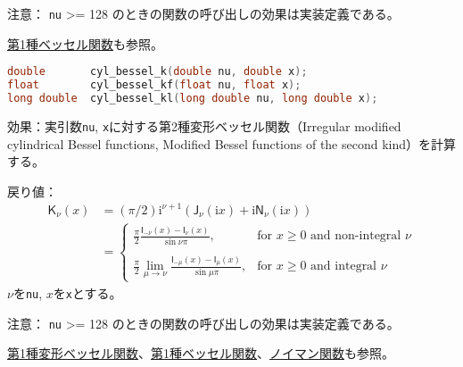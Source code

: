 \noindent
\textsf{注意}： \lstinline!nu! \textgreater{}= 128
のときの関数の呼び出しの効果は実装定義である。

\noindent
\hyperref[section8-16]{第1種ベッセル関数}も参照。

%

\bgroup
\begin{lstlisting}[language=C++, aboveskip=0.0zw]
double       cyl_bessel_k(double nu, double x);
float        cyl_bessel_kf(float nu, float x);
long double  cyl_bessel_kl(long double nu, long double x);
\end{lstlisting}
\egroup

\noindent
\textsf{効果}：実引数\lstinline!nu!,
\lstinline!x!に対する第2種変形ベッセル関数（Irregular modified
cylindrical Bessel functions, Modified Bessel functions of the second
kind）を計算する。

\noindent
\textsf{戻り値}：
\begin{align*}
  \mathsf{K}_\nu(x) &=
  (\pi/2)\mathrm{i}^{\nu+1} (            \mathsf{J}_\nu(\mathrm{i}x)
                + \mathrm{i} \mathsf{N}_\nu(\mathrm{i}x)
                ) \\
  &=
  \left\{
  \begin{array}{cl}
  \displaystyle
  \frac{\pi}{2}
  \frac{\mathsf{I}_{-\nu}(x) - \mathsf{I}_{\nu}(x)}
       {\sin \nu\pi },
  & \mbox{for $x \ge 0$ and non-integral $\nu$}
  \\
  \\
  \displaystyle
  \frac{\pi}{2}
  \lim_{\mu \rightarrow \nu} \frac{\mathsf{I}_{-\mu}(x) - \mathsf{I}_{\mu}(x)}
                                  {\sin \mu\pi },
  & \mbox{for $x \ge 0$ and integral $\nu$}
  \end{array}
  \right.
\end{align*}
\hspace*{3em}\(\nu\)を\lstinline!nu!, \(x\)を\lstinline!x!とする。

\noindent
\textsf{注意}： \lstinline!nu! \textgreater{}= 128
のときの関数の呼び出しの効果は実装定義である。

\noindent
\hyperref[section8-16]{第1種変形ベッセル関数}、\hyperref[section8-14]{第1種ベッセル関数}、\hyperref[section8-15]{ノイマン関数}も参照。

%

